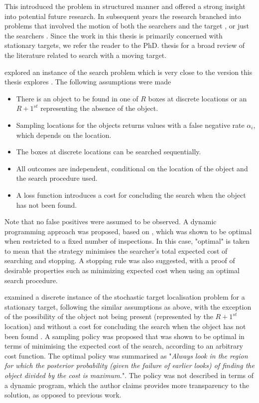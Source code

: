 \par This introduced the problem in structured manner and offered a strong insight into potential future research. In subsequent years the research branched into problems that involved the motion of both the searchers and the target \cite{Stone1980OptimalTargets}, or just the searchers \cite{Chew1966AProcedure}. Since the work in this thesis is primarily concerned with stationary targets, we refer the reader to the PhD. thesis \cite{Lau2007OptimalEnvironments} for a broad review of the literature related to search with a moving target. 

\citeauthor{Chew1966AProcedure} explored an instance of the search problem which is very close to the version this thesis explores \cite{Chew1966AProcedure}. The following assumptions were made
\begin{itemize}
    \item There is an object to be found in one of $R$ boxes at discrete locations or an $R+1^{st}$ representing the absence of the object.
    \item Sampling locations for the objects returns values with a false negative rate $\alpha_i$, which depends on the location.
    \item The boxes at discrete locations can be searched sequentially.
    \item All outcomes are independent, conditional on the location of the object and the search procedure used.
    \item A loss function introduces a cost for concluding the search when the object has not been found.
\end{itemize}
Note that no false positives were assumed to be observed. A dynamic programming approach was proposed, based on \cite{Blackwell1961DiscreteProgramming}, which was shown to be optimal when restricted to a fixed number of inspections. In this case, "optimal" is taken to mean that the strategy minimises the searcher's total expected cost of searching and stopping. A stopping rule was also suggested, with a proof of desirable properties such as minimizing expected cost when using an optimal search procedure.

\citeauthor{Black1965DiscretePROBLEM} examined a discrete instance of the stochastic target localisation problem for a stationary target, following the similar assumptions as \cite{Chew1966AProcedure} above, with the exception of the possibility of the object not being present (represented by the $R+1^{st}$ location) and without a cost for concluding the search when the object has not been found \cite{Black1965DiscretePROBLEM}. A sampling policy was proposed that was shown to be optimal in terms of minimising the expected cost of the search, according to an arbitrary cost function. The optimal policy was summarised as "\textit{Always look in the region for which the posterior probability (given the failure of earlier looks) of finding the object divided by the cost is maximum.}". The policy was not described in terms of a dynamic program, which the author claims provides more transparency to the solution, as opposed to previous work.

